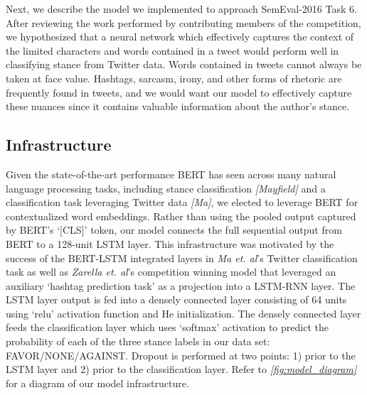 \documentclass[]{article}
\begin{document}
Next, we describe the model we implemented to approach SemEval-2016 Task
6. After reviewing the work performed by contributing members of the
competition, we hypothesized that a neural network which effectively
captures the context of the limited characters and words contained in a
tweet would perform well in classifying stance from Twitter data. Words
contained in tweets cannot always be taken at face value. Hashtags,
sarcasm, irony, and other forms of rhetoric are frequently found in
tweets, and we would want our model to effectively capture these nuances
since it contains valuable information about the author's stance.

\hypertarget{infrastructure}{%
\subsection{Infrastructure}\label{infrastructure}}

Given the state-of-the-art performance BERT has seen across many natural
language processing tasks, including stance classification
\emph{{[}Mayfield{]}} and a classification task leveraging Twitter data
\emph{{[}Ma{]}}, we elected to leverage BERT for contextualized word
embeddings. Rather than using the pooled output captured by BERT's
`{[}CLS{]}' token, our model connects the full sequential output from
BERT to a 128-unit LSTM layer. This infrastructure was motivated by the
success of the BERT-LSTM integrated layers in \emph{Ma et. al}'s Twitter
classification task as well as \emph{Zarella et. al}'s competition
winning model that leveraged an auxiliary `hashtag prediction task' as a
projection into a LSTM-RNN layer. The LSTM layer output is fed into a
densely connected layer consisting of 64 units using `relu' activation
function and He initialization. The densely connected layer feeds the
classification layer which uses `softmax' activation to predict the
probability of each of the three stance labels in our data set:
FAVOR/NONE/AGAINST. Dropout is performed at two points: 1) prior to the
LSTM layer and 2) prior to the classification layer. Refer to
\emph{\autoref{fig:model_diagram}} for a diagram of our model
infrastructure.
\end{document}
